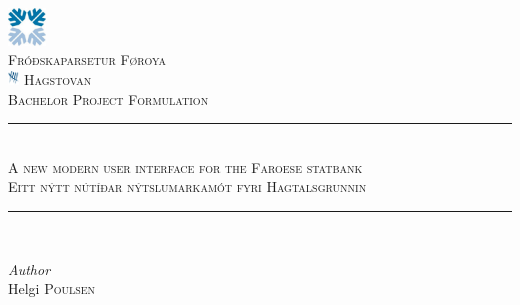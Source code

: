 
\begin{titlepage} %
	\raggedright

	\newcommand{\HRule}{\rule{\linewidth}{0.5mm}} %

	\center %
	
	
	
		\includegraphics[width = 10mm]{img/setur.jpeg}\\[4ex]
	\textsc{\LARGE Fróðskaparsetur Føroya} %
	\\[0.5cm]
			\includegraphics[width = 3mm]{img/hagstova_foroya.png}
	\textsc{\large Hagstovan} %
		\\[1.5cm]
	\textsc{\large Bachelor Project Formulation}\\[0.5cm] %
		\HRule\\[0.4cm]

\textsc{\Large A new modern user interface for the Faroese statbank}\\[0.5cm] %
	
\textsc{\normalsize Eitt nýtt nútíðar nýtslumarkamót fyri Hagtalsgrunnin}\\[0.5cm]	
	
		\HRule\\[0.4cm]

	
	
	
	\begin{minipage}{0.4\textwidth}
		\begin{center}	
			\large
			\textit{Author}\\
			Helgi \textsc{Poulsen} %
		\end{center}
	\end{minipage}
	
	\bigskip
	

\end{titlepage}
